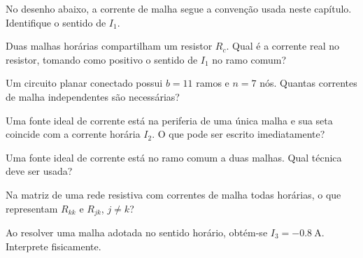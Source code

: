\blocofixacao
\begin{questao}[1]{}

No desenho abaixo, a corrente de malha segue a convenção usada neste capítulo.
Identifique o sentido de $I_1$.


\end{questao}
\begin{questao}[1]{}

Duas malhas horárias compartilham um resistor $R_c$. Qual é a corrente real no
resistor, tomando como positivo o sentido de $I_1$ no ramo comum?


\end{questao}
\begin{questao}[1]{}

Um circuito planar conectado possui $b=11$ ramos e $n=7$ nós. Quantas correntes
de malha independentes são necessárias?


\end{questao}
\begin{questao}[1]{}

Uma fonte ideal de corrente está na periferia de uma única malha e sua seta
coincide com a corrente horária $I_2$. O que pode ser escrito imediatamente?


\end{questao}
\begin{questao}[1]{}

Uma fonte ideal de corrente está no ramo comum a duas malhas. Qual técnica deve
ser usada?


\end{questao}
\begin{questao}[1]{}

Na matriz de uma rede resistiva com correntes de malha todas horárias, o que
representam $R_{kk}$ e $R_{jk}$, $j\ne k$?


\end{questao}
\begin{questao}[1]{}

Ao resolver uma malha adotada no sentido horário, obtém-se
$I_3=-\SI{0.8}{\ampere}$. Interprete fisicamente.


\end{questao}

